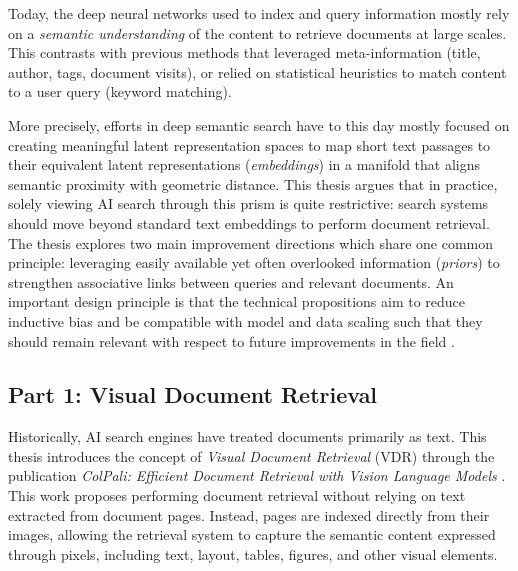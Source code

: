 Today, the deep neural networks used to index and query information mostly rely on a \emph{semantic understanding} of the content to retrieve documents at large scales. This contrasts with previous methods that leveraged meta-information (title, author, tags, document visits), or relied on statistical heuristics to match content to a user query (keyword matching).

More precisely, efforts in deep semantic search have to this day mostly focused on creating meaningful latent representation spaces to map short text passages to their equivalent latent representations (\emph{embeddings}) in a manifold that aligns semantic proximity with geometric distance. This thesis argues that in practice, solely viewing AI search through this prism is quite restrictive: search systems should move beyond standard text embeddings to perform document retrieval. The thesis explores two main improvement directions which share one common principle: leveraging easily available yet often overlooked information (\emph{priors}) to strengthen associative links between queries and relevant documents. An important design principle is that the technical propositions aim to reduce inductive bias and be compatible with model and data scaling such that they should remain relevant with respect to future improvements in the field .







\subsection{Part 1: Visual Document Retrieval}


Historically, AI search engines have treated documents primarily as text. This thesis introduces the concept of \textit{Visual Document Retrieval} (VDR) through the publication \emph{ColPali: Efficient Document Retrieval with Vision Language Models} . This work proposes performing document retrieval without relying on text extracted from document pages. Instead, pages are indexed directly from their images, allowing the retrieval system to capture the semantic content expressed through pixels, including text, layout, tables, figures, and other visual elements.

